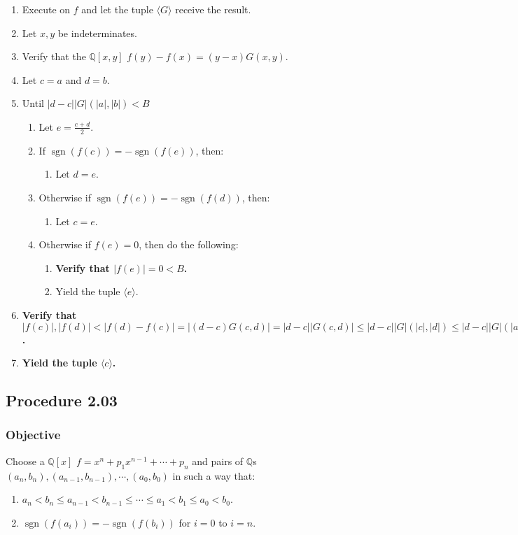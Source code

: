 \documentclass[twocolumn]{article}
\DeclareMathOperator{\sgn}{sgn}
\newcommand{\procedure}[2][]{\subsection*{Procedure #2 \ifthenelse{\equal{#1}{}}{}{(#1)}}\label{sec:procedure #2}}
\newcommand{\objective}{\subsubsection*{Objective}}
\newcommand{\procedurehr}[2][]{\hyperref[sec:procedure #2]{\ifthenelse{\equal{#1}{}}{procedure #2}{#1}}}
\begin{document}
				\begin{enumerate}
					\item Execute \procedurehr{2.0} on $f$ and let the tuple $\langle G\rangle$ receive the result.
					\item Let $x,y$ be indeterminates.
					\item Verify that the $\mathbb{Q}[x,y]$ $f(y)-f(x)=(y-x)G(x,y)$.
					\item Let $c=a$ and $d=b$.
					\item Until $\lvert d-c\rvert \lvert G\rvert(\lvert a\rvert,\lvert b\rvert)<B$
					\begin{enumerate}
						\item Let $e=\frac{c+d}{2}$.
						\item If $\sgn(f(c))=-\sgn(f(e))$, then:
						\begin{enumerate}
							\item Let $d=e$.
						\end{enumerate}
						\item Otherwise if $\sgn(f(e))=-\sgn(f(d))$, then:
						\begin{enumerate}
							\item Let $c=e$.
						\end{enumerate}
						\item Otherwise if $f(e)=0$, then do the following:
						\begin{enumerate}
							\item \textbf{Verify that $\lvert f(e)\rvert=0<B$.}
							\item Yield the tuple $\langle e\rangle$.
						\end{enumerate}
					\end{enumerate}
					\item \textbf{Verify that $\lvert f(c)\rvert,\lvert f(d)\rvert<\lvert f(d)-f(c)\rvert=\lvert(d-c)G(c,d)\rvert=\lvert d-c\rvert\lvert G(c,d)\rvert\le\lvert d-c\rvert\lvert G\rvert(\lvert c\rvert,\lvert d\rvert)\le\lvert d-c\rvert\lvert G\rvert(\lvert a\rvert,\lvert b\rvert)<B$.}
					\item \textbf{Yield the tuple $\langle c\rangle$.}
				\end{enumerate}
		\procedure{2.03}
			\objective
				Choose a $\mathbb{Q}[x]$ $f=x^n+p_1x^{n-1}+\cdots+p_n$ and pairs of $\mathbb{Q}$s $(a_n,b_n),(a_{n-1},b_{n-1}),\cdots,(a_0,b_0)$ in such a way that:
				\begin{enumerate}
					\item $a_n<b_n\le a_{n-1}<b_{n-1}\le\cdots\le a_1<b_1\le a_0<b_0$.
					\item $\sgn(f(a_i))=-\sgn(f(b_i))$ for $i=0$ to $i=n$.
				\end{enumerate}
\end{document}
